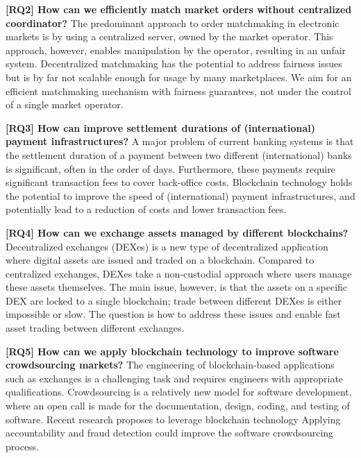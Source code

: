 \textbf{[RQ2] How can we efficiently match market orders without centralized coordinator?}
The predominant approach to order matchmaking in electronic markets is by using a centralized server, owned by the market operator.
This approach, however, enables manipulation by the operator, resulting in an unfair system.
Decentralized matchmaking has the potential to address fairness issues but is by far not scalable enough for usage by many marketplaces.
We aim for an efficient matchmaking mechanism with fairness guarantees, not under the control of a single market operator.

\textbf{[RQ3] How can improve settlement durations of (international) payment infrastructures?}
A major problem of current banking systems is that the settlement duration of a payment between two different (international) banks is significant, often in the order of days.
Furthermore, these payments require significant transaction fees to cover back-office costs.
Blockchain technology holds the potential to improve the speed of (international) payment infrastructures, and potentially lead to a reduction of costs and lower transaction fees.

\textbf{[RQ4] How can we exchange assets managed by different blockchains?}
Decentralized exchanges (DEXes) is a new type of decentralized application where digital assets are issued and traded on a blockchain.
Compared to centralized exchanges, DEXes take a non-custodial approach where users manage these assets themselves.
The main issue, however, is that the assets on a specific DEX are locked to a single blockchain; trade between different DEXes is either impossible or slow.
The question is how to address these issues and enable fast asset trading between different exchanges.

\textbf{[RQ5] How can we apply blockchain technology to improve software crowdsourcing markets?}
The engineering of blockchain-based applications such as exchanges is a challenging task and requires engineers with appropriate qualifications.
Crowdsourcing is a relatively new model for software development, where an open call is made for the documentation, design, coding, and testing of software.
Recent research proposes to leverage blockchain technology
Applying accountability and fraud detection could improve the software crowdsourcing process.

